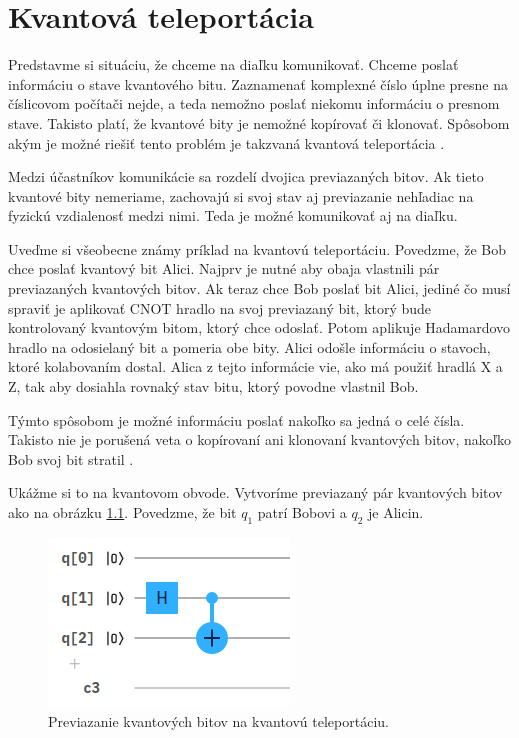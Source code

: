 
\chapter{Kvantová teleportácia}

Predstavme si situáciu, že chceme na diaľku komunikovať. Chceme poslať
informáciu o stave kvantového bitu. Zaznamenať komplexné číslo úplne presne 
na číslicovom počítači nejde, a teda nemožno poslať niekomu informáciu o 
presnom stave. Takisto platí, že kvantové bity je nemožné kopírovať či
klonovať. Spôsobom akým je možné riešiť tento problém je takzvaná kvantová
teleportácia \cite{Wat+01}.

Medzi účastníkov komunikácie sa rozdelí dvojica previazaných bitov. Ak tieto
kvantové bity nemeriame, zachovajú si svoj stav aj previazanie nehľadiac
na fyzickú vzdialenosť medzi nimi. Teda je možné komunikovať aj na diaľku.

Uveďme si všeobecne známy príklad na kvantovú teleportáciu. Povedzme, že 
Bob chce poslať kvantový bit Alici. Najprv je nutné aby obaja vlastnili
pár previazaných kvantových bitov. Ak teraz chce Bob poslať bit Alici, jediné
čo musí spraviť je aplikovať CNOT hradlo na svoj previazaný bit, ktorý bude 
kontrolovaný kvantovým bitom, ktorý chce odoslať. Potom aplikuje Hadamardovo
hradlo na odosielaný bit a pomeria obe bity. Alici odošle informáciu o
stavoch, ktoré kolabovaním dostal. Alica z tejto informácie vie, ako má použiť
hradlá X a Z, tak aby dosiahla rovnaký stav bitu, ktorý povodne vlastnil Bob.

Týmto spôsobom je možné informáciu poslať nakoľko sa jedná o celé čísla.
Takisto nie je porušená veta o kopírovaní ani klonovaní kvantových bitov, 
nakoľko Bob svoj bit stratil \cite{Wol+01}.

Ukážme si to na kvantovom obvode. Vytvoríme previazaný pár kvantových bitov
ako na obrázku \ref{tel_c1}. Povedzme, že bit \(q_1\) patrí Bobovi a \(q_2\)
je Alicin.

\begin{figure}[H]
	\centering 
	\includegraphics[width=.5\textwidth]{figures/tel_c1.png} 
	\caption{Previazanie kvantových bitov na kvantovú teleportáciu.}
    \label{tel_c1}
\end{figure}

